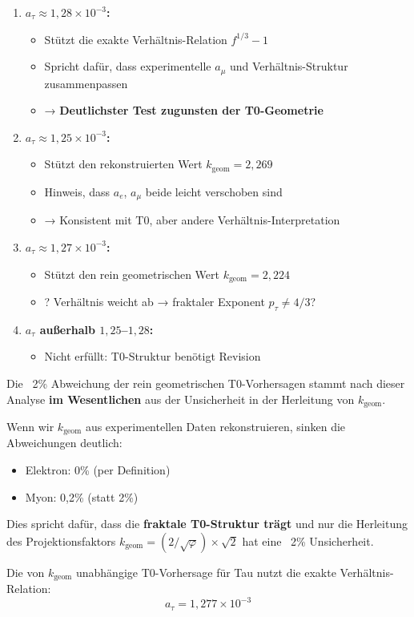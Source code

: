 	\begin{enumerate}
		\item \textbf{$a_\tau \approx 1{,}28 \times 10^{-3}$:}
		\begin{itemize}
			\item Stützt die exakte Verhältnis-Relation $f^{1/3} - 1$
			\item Spricht dafür, dass experimentelle $a_\mu$ und Verhältnis-Struktur zusammenpassen
			\item → \textbf{Deutlichster Test zugunsten der T0-Geometrie}
		\end{itemize}
		
		\item \textbf{$a_\tau \approx 1{,}25 \times 10^{-3}$:}
		\begin{itemize}
			\item Stützt den rekonstruierten Wert $k_{\text{geom}} = 2{,}269$
			\item Hinweis, dass $a_e$, $a_\mu$ beide leicht verschoben sind
			\item → Konsistent mit T0, aber andere Verhältnis-Interpretation
		\end{itemize}
		
		\item \textbf{$a_\tau \approx 1{,}27 \times 10^{-3}$:}
		\begin{itemize}
			\item Stützt den rein geometrischen Wert $k_{\text{geom}} = 2{,}224$
			\item ? Verhältnis weicht ab → fraktaler Exponent $p_\tau \neq 4/3$?
		\end{itemize}
		
		\item \textbf{$a_\tau$ außerhalb $1{,}25$--$1{,}28$:}
		\begin{itemize}
			\item Nicht erfüllt: T0-Struktur benötigt Revision
		\end{itemize}
	\end{enumerate}
	
	\begin{keypoint}[Kernaussage]
		Die ~2\% Abweichung der rein geometrischen T0-Vorhersagen stammt nach dieser Analyse \textbf{im Wesentlichen} aus der Unsicherheit in der Herleitung von $k_{\text{geom}}$.
		
		Wenn wir $k_{\text{geom}}$ aus experimentellen Daten rekonstruieren, sinken die Abweichungen deutlich:
		\begin{itemize}
			\item Elektron: 0\% (per Definition)
			\item Myon: 0{,}2\% (statt 2\%)
		\end{itemize}
		
		Dies spricht dafür, dass die \textbf{fraktale T0-Struktur trägt} und nur die Herleitung des Projektionsfaktors $k_{\text{geom}} = (2/\sqrt{\varphi}) \times \sqrt{2}$ hat eine ~2\% Unsicherheit.
		
		Die von $k_{\text{geom}}$ unabhängige T0-Vorhersage für Tau nutzt die exakte Verhältnis-Relation:
		\begin{equation}
			\boxed{a_\tau = 1{,}277 \times 10^{-3}}
		\end{equation}
	\end{keypoint}	
